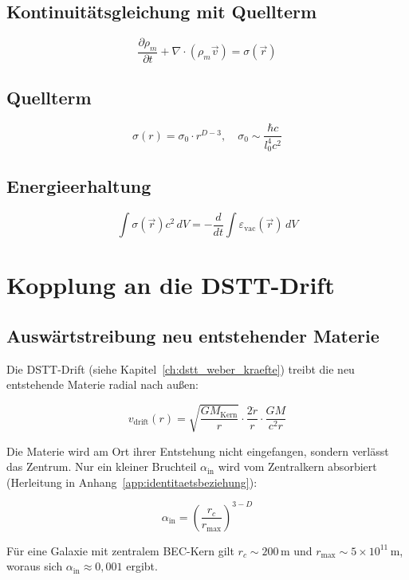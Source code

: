 \subsection{Kontinuitätsgleichung mit Quellterm}

\[
\frac{\partial \rho_m}{\partial t} + \nabla \cdot (\rho_m \vec{v}) = \sigma(\vec{r})
\]

\subsection{Quellterm}

\[
\boxed{\sigma(r) = \sigma_0 \cdot r^{D-3}}, \quad \sigma_0 \sim \frac{\hbar c}{l_0^4 c^2}
\]

\subsection{Energieerhaltung}

\[
\int \sigma(\vec{r}) c^2 \, dV = -\frac{d}{dt} \int \varepsilon_{\text{vac}}(\vec{r}) \, dV
\]

\section{Kopplung an die DSTT-Drift}
\label{app:materieentstehung_drift}

\subsection{Auswärtstreibung neu entstehender Materie}
\label{sub:materieentstehung_auswaerts}

Die DSTT-Drift (siehe Kapitel~\ref{ch:dstt_weber_kraefte}) treibt die neu entstehende Materie radial nach außen:

\[
v_{\text{drift}}(r) = \sqrt{\frac{GM_{\text{Kern}}}{r}} \cdot \frac{2\dot{r}}{r} \cdot \frac{GM}{c^2 r}
\]

Die Materie wird am Ort ihrer Entstehung nicht eingefangen, sondern verlässt das Zentrum. Nur ein kleiner Bruchteil \( \alpha_{\text{in}} \) wird vom Zentralkern absorbiert (Herleitung in Anhang~\ref{app:identitaetsbeziehung}):

\[
\alpha_{\text{in}} = \left( \frac{r_c}{r_{\text{max}}} \right)^{3-D}
\]

Für eine Galaxie mit zentralem BEC-Kern gilt \( r_c \sim 200 \, \text{m} \) und \( r_{\text{max}} \sim 5 \times 10^{11} \, \text{m} \), woraus sich \( \alpha_{\text{in}} \approx 0,001 \) ergibt.

